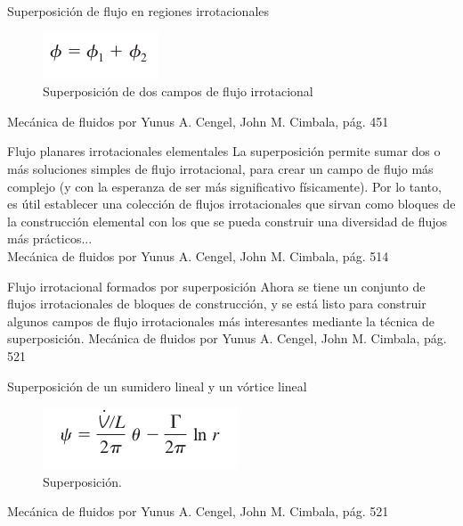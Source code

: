 
\begin{frame}{Superposición de flujo en regiones irrotacionales}
\justifying
\begin{figure}[H]
\centering
\includegraphics[scale=0.35]{Section_Files/S3-imagenes-Jhon/0091.png}
\caption{Superposición de dos campos de flujo irrotacional}
\end{figure}
{\tiny Mecánica de fluidos por Yunus A. Cengel, John M. Cimbala, pág. 451}
\end{frame}


\begin{frame}{Flujo planares irrotacionales elementales}
\justifying
La superposición permite sumar dos o más soluciones simples de flujo irrotacional, para crear un campo de flujo más complejo (y con la esperanza de ser más significativo físicamente). Por lo tanto, es útil establecer una colección de flujos irrotacionales que sirvan como bloques de la construcción elemental con los que se pueda construir una diversidad de flujos más prácticos...
\\
{\tiny Mecánica de fluidos por Yunus A. Cengel, John M. Cimbala, pág. 514}
\end{frame}



\begin{frame}{Flujo irrotacional formados por superposición}
\justifying
Ahora se tiene un conjunto de flujos irrotacionales de bloques de construcción, y se está listo para construir algunos campos de flujo irrotacionales más interesantes mediante la técnica de superposición.
{\tiny Mecánica de fluidos por Yunus A. Cengel, John M. Cimbala, pág. 521}
\end{frame}


\begin{frame}{Superposición de un sumidero lineal y un vórtice lineal}
\justifying
\begin{figure}[H]
\centering
\includegraphics[scale=0.35]{Section_Files/S3-imagenes-Jhon/0132.png}
\caption{Superposición.}
\end{figure}
{\tiny Mecánica de fluidos por Yunus A. Cengel, John M. Cimbala, pág. 521}
\end{frame}

